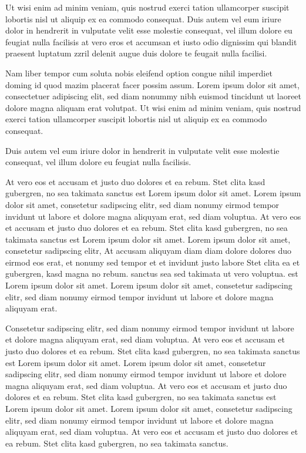 Ut wisi enim ad minim veniam, quis nostrud exerci tation ullamcorper suscipit lobortis nisl ut aliquip ex ea commodo consequat. Duis autem vel eum iriure dolor in hendrerit in vulputate velit esse molestie consequat, vel illum dolore eu feugiat nulla facilisis at vero eros et accumsan et iusto odio dignissim qui blandit praesent luptatum zzril delenit augue duis dolore te feugait nulla facilisi.

Nam liber tempor cum soluta nobis eleifend option congue nihil imperdiet doming id quod mazim placerat facer possim assum. Lorem ipsum dolor sit amet, consectetuer adipiscing elit, sed diam nonummy nibh euismod tincidunt ut laoreet dolore magna aliquam erat volutpat. Ut wisi enim ad minim veniam, quis nostrud exerci tation ullamcorper suscipit lobortis nisl ut aliquip ex ea commodo consequat.

Duis autem vel eum iriure dolor in hendrerit in vulputate velit esse molestie consequat, vel illum dolore eu feugiat nulla facilisis. 

At vero eos et accusam et justo duo dolores et ea rebum. Stet clita kasd gubergren, no sea takimata sanctus est Lorem ipsum dolor sit amet. Lorem ipsum dolor sit amet, consetetur sadipscing elitr, sed diam nonumy eirmod tempor invidunt ut labore et dolore magna aliquyam erat, sed diam voluptua. At vero eos et accusam et justo duo dolores et ea rebum. Stet clita kasd gubergren, no sea takimata sanctus est Lorem ipsum dolor sit amet. Lorem ipsum dolor sit amet, consetetur sadipscing elitr, At accusam aliquyam diam diam dolore dolores duo eirmod eos erat, et nonumy sed tempor et et invidunt justo labore Stet clita ea et gubergren, kasd magna no rebum. sanctus sea sed takimata ut vero voluptua. est Lorem ipsum dolor sit amet. Lorem ipsum dolor sit amet, consetetur sadipscing elitr, sed diam nonumy eirmod tempor invidunt ut labore et dolore magna aliquyam erat.

Consetetur sadipscing elitr, sed diam nonumy eirmod tempor invidunt ut labore et dolore magna aliquyam erat, sed diam voluptua. At vero eos et accusam et justo duo dolores et ea rebum. Stet clita kasd gubergren, no sea takimata sanctus est Lorem ipsum dolor sit amet. Lorem ipsum dolor sit amet, consetetur sadipscing elitr, sed diam nonumy eirmod tempor invidunt ut labore et dolore magna aliquyam erat, sed diam voluptua. At vero eos et accusam et justo duo dolores et ea rebum. Stet clita kasd gubergren, no sea takimata sanctus est Lorem ipsum dolor sit amet. Lorem ipsum dolor sit amet, consetetur sadipscing elitr, sed diam nonumy eirmod tempor invidunt ut labore et dolore magna aliquyam erat, sed diam voluptua. At vero eos et accusam et justo duo dolores et ea rebum. Stet clita kasd gubergren, no sea takimata sanctus.

